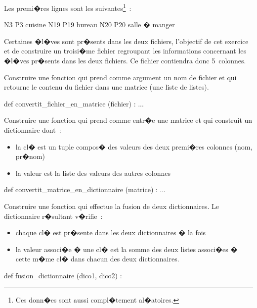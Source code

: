 \begin{xexercicenot}
Les premi�res lignes sont les suivantes\footnote{Ces donn�es sont aussi compl�tement al�atoires.}~:
\vspace{-0.15cm}
\begin{verbatimx}
N3    P3    cuisine
N19   P19   bureau
N20   P20   salle � manger
\end{verbatimx}
\vspace{-0.15cm}

Certaines �l�ves sont pr�sents dans les deux fichiers, l'objectif de cet exercice et de construire un troisi�me fichier regroupant les informations concernant les �l�ves pr�sents dans les deux fichiers. Ce fichier contiendra donc 5~colonnes.

\exequest Construire une fonction qui prend comme argument un nom de fichier et qui retourne le contenu du fichier dans une matrice (une liste de listes).
\vspace{-0.15cm}
\begin{verbatimx}
def convertit_fichier_en_matrice (fichier) :
...
\end{verbatimx}

\exequest Construire une fonction qui prend comme entr�e une matrice et qui construit un dictionnaire dont~:
\begin{itemize}
\item la cl� est un tuple compos� des valeurs des deux premi�res colonnes (nom, pr�nom)
\item la valeur est la liste des valeurs des autres colonnes
\end{itemize}
\vspace{-0.15cm}

\begin{verbatimx}
def convertit_matrice_en_dictionnaire (matrice) :
...
\end{verbatimx}

\exequest Construire une fonction qui effectue la fusion de deux dictionnaires. Le dictionnaire r�sultant v�rifie~:
\begin{itemize}
\item chaque cl� est pr�sente dans les deux dictionnaires � la fois
\item la valeur associ�e � une cl� est la somme des deux listes associ�es � cette m�me cl� dans chacun des deux dictionnaires.
\end{itemize}
\vspace{-0.15cm}

\begin{verbatimx}
def fusion_dictionnaire (dico1, dico2) :
\end{verbatimx}
\vspace{-0.15cm}



\end{xexercicenot}

